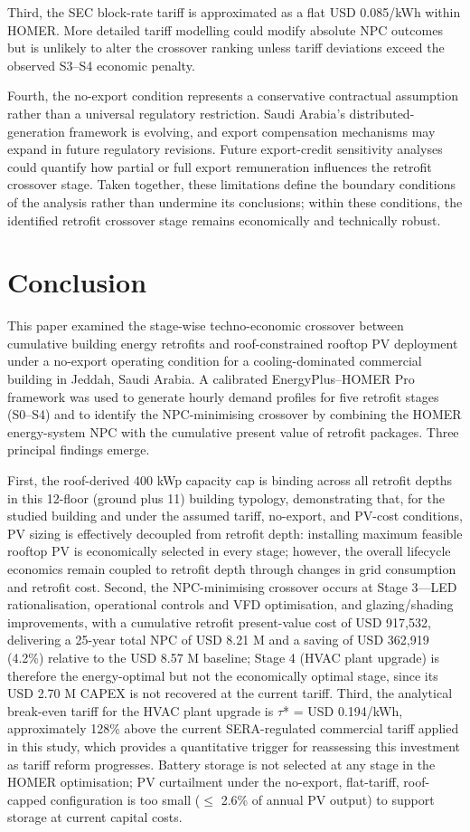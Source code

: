 \documentclass[journal,fleqn]{IEEEtran}
\begin{document}
Third, the SEC block-rate tariff is approximated as a flat USD 0.085/kWh within HOMER. More detailed tariff modelling could modify absolute NPC outcomes but is unlikely to alter the crossover ranking unless tariff deviations exceed the observed S3--S4 economic penalty.


Fourth, the no-export condition represents a conservative contractual assumption rather than a universal regulatory restriction. Saudi Arabia's distributed-generation framework is evolving, and export compensation mechanisms may expand in future regulatory revisions. Future export-credit sensitivity analyses could quantify how partial or full export remuneration influences the retrofit crossover stage. Taken together, these limitations define the boundary conditions of the analysis rather than undermine its conclusions; within these conditions, the identified retrofit crossover stage remains economically and technically robust.


\section{Conclusion}

This paper examined the stage-wise techno-economic crossover between cumulative building energy retrofits and roof-constrained rooftop PV deployment under a no-export operating condition for a cooling-dominated commercial building in Jeddah, Saudi Arabia. A calibrated EnergyPlus--HOMER Pro framework was used to generate hourly demand profiles for five retrofit stages (S0--S4) and to identify the NPC-minimising crossover by combining the HOMER energy-system NPC with the cumulative present value of retrofit packages. Three principal findings emerge.


First, the roof-derived 400 kWp capacity cap is binding across all retrofit depths in this 12-floor (ground plus 11) building typology, demonstrating that, for the studied building and under the assumed tariff, no-export, and PV-cost conditions, PV sizing is effectively decoupled from retrofit depth: installing maximum feasible rooftop PV is economically selected in every stage; however, the overall lifecycle economics remain coupled to retrofit depth through changes in grid consumption and retrofit cost. Second, the NPC-minimising crossover occurs at Stage 3---LED rationalisation, operational controls and VFD optimisation, and glazing/shading improvements, with a cumulative retrofit present-value cost of USD 917,532, delivering a 25-year total NPC of USD 8.21 M and a saving of USD 362,919 (4.2\%) relative to the USD 8.57 M baseline; Stage 4 (HVAC plant upgrade) is therefore the energy-optimal but not the economically optimal stage, since its USD 2.70 M CAPEX is not recovered at the current tariff. Third, the analytical break-even tariff for the HVAC plant upgrade is $\tau$* = USD 0.194/kWh, approximately 128\% above the current SERA-regulated commercial tariff applied in this study, which provides a quantitative trigger for reassessing this investment as tariff reform progresses. Battery storage is not selected at any stage in the HOMER optimisation; PV curtailment under the no-export, flat-tariff, roof-capped configuration is too small ($\leq$ 2.6\% of annual PV output) to support storage at current capital costs.
\end{document}
